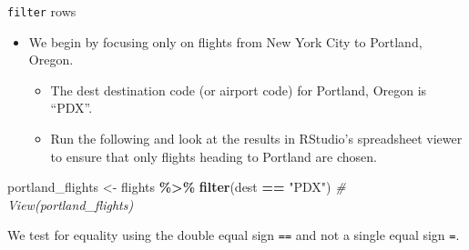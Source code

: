 \documentclass[
  ignorenonframetext,
]{beamer}
\newenvironment{Shaded}{\begin{snugshade}}{\end{snugshade}}
\newcommand{\CommentTok}[1]{\textcolor[rgb]{0.56,0.35,0.01}{\textit{#1}}}
\newcommand{\FunctionTok}[1]{\textcolor[rgb]{0.13,0.29,0.53}{\textbf{#1}}}
\newcommand{\NormalTok}[1]{#1}
\newcommand{\OtherTok}[1]{\textcolor[rgb]{0.56,0.35,0.01}{#1}}
\newcommand{\SpecialCharTok}[1]{\textcolor[rgb]{0.81,0.36,0.00}{\textbf{#1}}}
\newcommand{\StringTok}[1]{\textcolor[rgb]{0.31,0.60,0.02}{#1}}
\providecommand{\tightlist}{%
  \setlength{\itemsep}{0pt}\setlength{\parskip}{0pt}}
\begin{document}
\begin{frame}[fragile]{\texttt{filter} rows}
\protect\hypertarget{filter-rows-1}{}
\begin{itemize}
\item
  We begin by focusing only on flights from New York City to Portland,
  Oregon.

  \begin{itemize}
  \tightlist
  \item
    The dest destination code (or airport code) for Portland, Oregon is
    ``PDX''.
  \item
    Run the following and look at the results in RStudio's spreadsheet
    viewer to ensure that only flights heading to Portland are chosen.
  \end{itemize}
\end{itemize}

\normalsize

\begin{Shaded}
\begin{Highlighting}[]
\NormalTok{portland\_flights }\OtherTok{\textless{}{-}}\NormalTok{ flights }\SpecialCharTok{\%\textgreater{}\%} 
  \FunctionTok{filter}\NormalTok{(dest }\SpecialCharTok{==} \StringTok{"PDX"}\NormalTok{)}
\CommentTok{\# View(portland\_flights)}
\end{Highlighting}
\end{Shaded}

\normalsize

We test for equality using the double equal sign \texttt{==} and not a
single equal sign \texttt{=}.
\end{frame}
\end{document}
